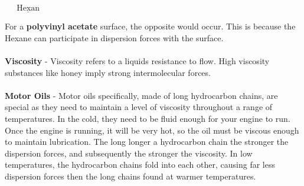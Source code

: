 \documentclass{article}
\begin{document}
\begin{qq}
\begin{center}
\begin{minipage}{7cm}
			\begin{center}
				$\quad\:\:\underline{\text{Hexan}}$
			\end{center}
		\end{minipage}

	\end{center}

\end{qq}
\noindent For a \textbf{polyvinyl acetate} surface, the opposite would occur. This is because the Hexane can participate in dispersion forces with the surface. \\
\\
\textbf{Viscosity} - Viscosity refers to a liquids resistance to flow. High viscosity substances like honey imply strong intermolecular forces. \\
\\
\textbf{Motor Oils } - Motor oils specifically, made of long hydrocarbon chains, are special as they need to maintain a level of viscosity throughout a range of temperatures. In the cold, they need to be fluid enough for your engine to run. Once the engine is running, it will be very hot, so the oil must be viscous enough to maintain lubrication. The long longer a hydrocarbon chain the stronger the dispersion forces, and subsequently the stronger the viscosity. In low temperatures, the hydrocarbon chains fold into each other, causing far less dispersion forces then the long chains found at warmer temperatures.\\
\end{document}
